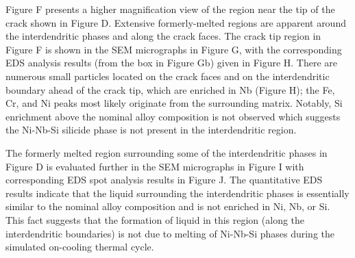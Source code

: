 Figure F presents a higher magnification view of the region near the tip of the crack shown in Figure D. Extensive formerly-melted regions are apparent around the interdendritic phases and along the crack faces. The crack tip region in Figure F is shown in the SEM micrographs in Figure G, with the corresponding EDS analysis results (from the box in Figure Gb) given in Figure H. There are numerous small particles located on the crack faces and on the interdendritic boundary ahead of the crack tip, which are enriched in Nb (Figure H); the Fe, Cr, and Ni peaks most likely originate from the surrounding matrix. Notably, Si enrichment above the nominal alloy composition is not observed which suggests the Ni-Nb-Si silicide phase is not present in the interdendritic region. 

The formerly melted region surrounding some of the interdendritic phases in Figure D is evaluated further in the SEM micrographs in Figure I with corresponding EDS spot analysis results in Figure J. The quantitative EDS results indicate that the liquid surrounding the interdendritic phases is essentially similar to the nominal alloy composition and is not enriched in Ni, Nb, or Si. This fact suggests that the formation of liquid in this region (along the interdendritic boundaries) is not due to melting of Ni-Nb-Si phases during the simulated on-cooling thermal cycle.

